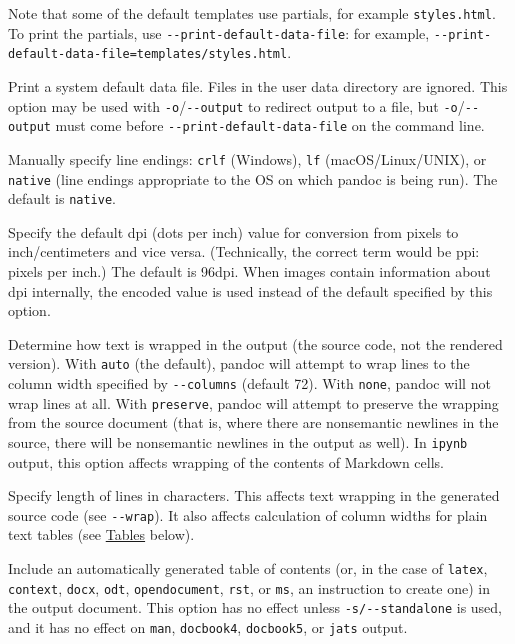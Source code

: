 \documentclass[
  b5paper
]{book}
\begin{document}
\begin{description}
Note that some of the default templates use partials, for example
\texttt{styles.html}. To print the partials, use
\texttt{-\/-print-default-data-file}: for example,
\texttt{-\/-print-default-data-file=templates/styles.html}.
\item[\texttt{-\/-print-default-data-file=}\emph{FILE}]
Print a system default data file. Files in the user data directory are
ignored. This option may be used with \texttt{-o}/\texttt{-\/-output} to
redirect output to a file, but \texttt{-o}/\texttt{-\/-output} must come
before \texttt{-\/-print-default-data-file} on the command line.
\item[\texttt{-\/-eol=crlf}\textbar{}\texttt{lf}\textbar{}\texttt{native}]
Manually specify line endings: \texttt{crlf} (Windows), \texttt{lf}
(macOS/Linux/UNIX), or \texttt{native} (line endings appropriate to the
OS on which pandoc is being run). The default is \texttt{native}.
\item[\texttt{-\/-dpi}=\emph{NUMBER}]
Specify the default dpi (dots per inch) value for conversion from pixels
to inch/centimeters and vice versa. (Technically, the correct term would
be ppi: pixels per inch.) The default is 96dpi. When images contain
information about dpi internally, the encoded value is used instead of
the default specified by this option.
\item[\texttt{-\/-wrap=auto}\textbar{}\texttt{none}\textbar{}\texttt{preserve}]
Determine how text is wrapped in the output (the source code, not the
rendered version). With \texttt{auto} (the default), pandoc will attempt
to wrap lines to the column width specified by \texttt{-\/-columns}
(default 72). With \texttt{none}, pandoc will not wrap lines at all.
With \texttt{preserve}, pandoc will attempt to preserve the wrapping
from the source document (that is, where there are nonsemantic newlines
in the source, there will be nonsemantic newlines in the output as
well). In \texttt{ipynb} output, this option affects wrapping of the
contents of Markdown cells.
\item[\texttt{-\/-columns=}\emph{NUMBER}]
Specify length of lines in characters. This affects text wrapping in the
generated source code (see \texttt{-\/-wrap}). It also affects
calculation of column widths for plain text tables (see
\hyperref[tables]{Tables} below).
\item[\texttt{-\/-toc{[}=true\textbar{}false{]}},
\texttt{-\/-table-of-contents{[}=true\textbar{}false{]}}]
Include an automatically generated table of contents (or, in the case of
\texttt{latex}, \texttt{context}, \texttt{docx}, \texttt{odt},
\texttt{opendocument}, \texttt{rst}, or \texttt{ms}, an instruction to
create one) in the output document. This option has no effect unless
\texttt{-s/-\/-standalone} is used, and it has no effect on
\texttt{man}, \texttt{docbook4}, \texttt{docbook5}, or \texttt{jats}
output.


\end{description}
\end{document}

